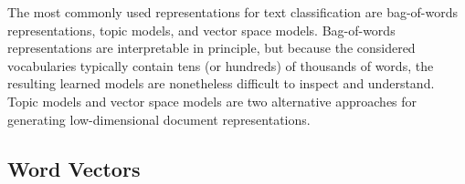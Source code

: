 The most commonly used representations for text classification are bag-of-words representations, topic models, and vector space models. Bag-of-words representations are interpretable in principle, but because the considered vocabularies typically contain tens (or hundreds) of thousands of words, the resulting learned models are nonetheless difficult to inspect and understand. Topic models and vector space models are two alternative approaches for generating low-dimensional document representations. %

\subsection{Word Vectors}
